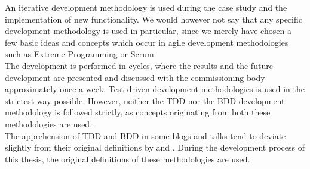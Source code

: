 
An iterative development methodology is used during the case study and
the implementation of new functionality. We would however not say that
any specific development methodology is used in particular, since we
merely have chosen a few basic ideas and concepts which occur in agile
development methodologies such as Extreme Programming or Scrum.\\

The development is performed in cycles, where the results and the future
development are presented and discussed with the commissioning body
approximately once a week. Test-driven development methodologies is used
in the strictest way possible. However, neither the TDD nor the BDD
development methodology is followed strictly, as concepts originating
from both these methodologies are used.\\

The apprehension of TDD and BDD in some blogs and talks tend to deviate
slightly from their original definitions by \citeauthor{book:tdd_beck}
and \citeauthor{web:dan_north}. During the development process of this
thesis, the original definitions of these methodologies are used.\\
